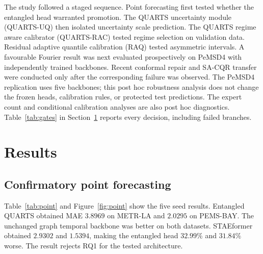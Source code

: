 \documentclass[pdflatex,sn-mathphys-num]{sn-jnl}
\begin{document}
The study followed a staged sequence. Point forecasting first tested whether the entangled head warranted promotion. The QUARTS uncertainty module (QUARTS-UQ) then isolated uncertainty scale prediction. The QUARTS regime aware calibrator (QUARTS-RAC) tested regime selection on validation data. Residual adaptive quantile calibration (RAQ) tested asymmetric intervals. A favourable Fourier result was next evaluated prospectively on PeMSD4 with independently trained backbones. Recent conformal repair and SA-CQR transfer were conducted only after the corresponding failure was observed. The PeMSD4 replication uses five backbones; this post hoc robustness analysis does not change the frozen heads, calibration rules, or protected test predictions. The expert count and conditional calibration analyses are also post hoc diagnostics. Table~\ref{tab:gates} in Section~\ref{sec:results} reports every decision, including failed branches.

\section{Results}\label{sec:results}

\subsection{Confirmatory point forecasting}\label{subsec:pointresults}

Table~\ref{tab:point} and Figure~\ref{fig:point} show the five seed results. Entangled QUARTS obtained MAE \(3.8969\) on METR-LA and \(2.0295\) on PEMS-BAY. The unchanged graph temporal backbone was better on both datasets. STAEformer obtained \(2.9302\) and \(1.5394\), making the entangled head \(32.99\%\) and \(31.84\%\) worse. The result rejects RQ1 for the tested architecture.
\end{document}
